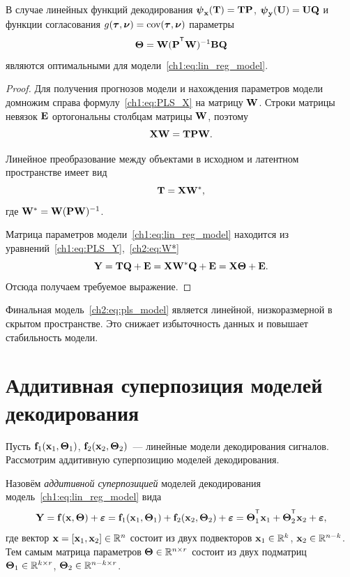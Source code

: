 \begin{theorem}
	В случае линейных функций декодирования $\boldsymbol{\psi}_{\mathbf{x}}(\mathbf{T}) = \mathbf{T} \mathbf{P}$, $\boldsymbol{\psi}_{\mathbf{y}} (\mathbf{U}) = \mathbf{U} \mathbf{Q}$ и функции согласования $g(\boldsymbol{\tau}, \boldsymbol{\nu}) = \textnormal{cov}(\boldsymbol{\tau}, \boldsymbol{\nu})$ параметры
	\[
		\bTheta = \bW (\bP^{\T} \bW)^{-1} \bB \bQ
	\]
	являются оптимальными для модели~\eqref{ch1:eq:lin_reg_model}.
\end{theorem}
\begin{proof}
	Для получения прогнозов модели и нахождения параметров модели 
	домножим справа формулу~\eqref{ch1:eq:PLS_X} на матрицу $\mathbf{W}$. Строки матрицы невязок $\mathbf{E}$ ортогональны столбцам матрицы $\mathbf{W}$, поэтому 
	\[
		\mathbf{X} \mathbf{W} = \mathbf{T} \mathbf{P} \mathbf{W}.
	\] 
	
	Линейное преобразование между объектами в исходном и латентном пространстве имеет вид
	\begin{equation}
		\mathbf{T} = \mathbf{X} \mathbf{W}^*,
		\label{ch2:eq:W*}
	\end{equation}
	где $\mathbf{W}^* = \mathbf{W} (\mathbf{P} \mathbf{W})^{-1}$. 
	
	Матрица параметров модели~\ref{ch1:eq:lin_reg_model} находится из уравнений~\eqref{ch1:eq:PLS_Y},~\eqref{ch2:eq:W*}
	\begin{equation}
		\mathbf{Y} = \mathbf{T} \mathbf{Q} + \mathbf{E} = \mathbf{X} \mathbf{W}^* \mathbf{Q} + \mathbf{E} = \mathbf{X} \boldsymbol{\Theta} + \mathbf{E}.
		\label{ch2:eq:pls_model}
	\end{equation}
	Отсюда получаем требуемое выражение.
\end{proof}
Финальная модель~\eqref{ch2:eq:pls_model} является линейной, низкоразмерной в скрытом пространстве. 
Это снижает избыточность данных и повышает стабильность модели.

\section{Аддитивная суперпозиция моделей декодирования}
\label{sec:ch2:superposition}

Пусть $\mathbf{f}_1(\mathbf{x}_1, \boldsymbol{\Theta}_1)$, $\mathbf{f}_2(\mathbf{x}_2, \boldsymbol{\Theta}_2)$~--- линейные модели декодирования сигналов. 
Рассмотрим аддитивную суперпозицию моделей декодирования.
\begin{definition}
	Назовём \textit{аддитивной суперпозицией} моделей декодирования модель~\eqref{ch1:eq:lin_reg_model} вида
	\begin{equation}
		\bY = \mathbf{f}(\bx, \bTheta) + \bepsilon = \mathbf{f}_1(\bx_1, \bTheta_1) + \mathbf{f}_2(\bx_2, \bTheta_2) + \bepsilon = \bTheta_1^{\T} \bx_1 + \bTheta_2^{\T} \bx_2 + \bepsilon,
		\label{ch2:eq:two_modal_reg_model}
	\end{equation}
	где вектор $\mathbf{x} = [\mathbf{x}_1, \mathbf{x}_2] \in \mathbb{R}^n$ состоит из двух подвекторов $\mathbf{x}_1 \in \mathbb{R}^k$, $\mathbf{x}_2 \in \mathbb{R}^{n - k}$. 
	Тем самым матрица параметров $\boldsymbol{\Theta} \in \mathbb{R}^{n \times r}$ состоит из двух подматриц $\boldsymbol{\Theta}_1 \in \mathbb{R}^{k \times r}$, $\boldsymbol{\Theta}_2 \in \mathbb{R}^{n - k \times r}$. 
\end{definition}

